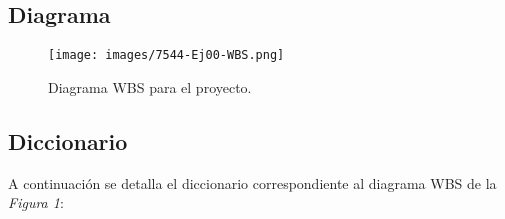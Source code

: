 \documentclass{article}
\begin{document}
\subsection{Diagrama}


\begin{figure}[h]
	\centering
	\texttt{[image: images/7544-Ej00-WBS.png]}
	\medskip
	\caption{Diagrama WBS para el proyecto.}
\end{figure}
\bigskip\bigskip\bigskip\bigskip


\subsection{Diccionario}

	A continuación se detalla el diccionario correspondiente al diagrama WBS de la \textit{Figura 1}:
	\bigskip
\end{document}
